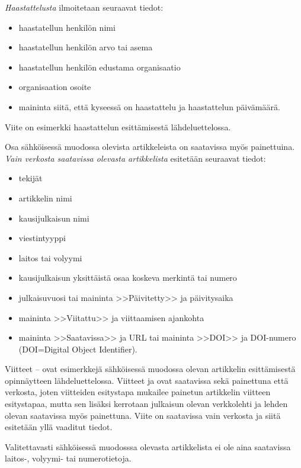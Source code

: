 \documentclass[english,12pt,a4paper,pdftex,sci,utf8]{aaltothesis}
\begin{document}
\textit{Haastattelusta} ilmoitetaan seuraavat tiedot:

\begin{itemize}
\item[--]haastatellun henkil\"on nimi
\item[--]haastatellun henkil\"on arvo tai asema
\item[--]haastatellun henkil\"on edustama organisaatio
\item[--]organisaation osoite
\item[--]maininta siit\"a, ett\"a kyseess\"a on haastattelu ja haastattelun
p\"aiv\"am\"a\"ar\"a. 
\end{itemize}

Viite \cite{haastattelu} on esimerkki 
haastattelun esitt\"amisest\"a l\"ahdeluettelossa.

Osa s\"ahk\"oisess\"a muodossa olevista artikkeleista on saatavissa my\"os
painettuina. \textit{Vain verkosta saatavissa olevasta artikkelista} esitet\"a\"an
seuraavat tiedot:

\begin{itemize}
\item[--]tekij\"at
\item[--]artikkelin nimi
\item[--]kausijulkaisun nimi
\item[--]viestintyyppi
\item[--]laitos tai volyymi
\item[--]kausijulkaisun yksitt\"aist\"a osaa koskeva merkint\"a tai numero
\item[--]julkaisuvuosi tai maininta >>P\"aivitetty>> ja p\"aivitysaika
\item[--]maininta >>Viitattu>> ja viittaamisen ajankohta 
\item[--]maininta >>Saatavissa>> ja URL tai 
        maininta >>DOI>> ja DOI-numero (DOI=Digital Object Identifier).
\end{itemize}

Viitteet \cite{Ribeiro}--\cite{kone} ovat esimerkkej\"a s\"ahk\"oisess\"a
muodossa olevan artikkelin esitt\"amisest\"a opinn\"aytteen
l\"ahdeluettelossa.  Viitteet \cite{Ribeiro} ja \cite{Stieber} ovat
saatavissa sek\"a painettuna ett\"a verkosta, joten viitteiden esitystapa
mukailee painetun artikkelin viitteen esitystapaa, mutta sen lis\"aksi
kerrotaan julkaisun olevan verkkolehti ja lehden olevan saatavissa
my\"os painettuna.  Viite \cite{kone} on saatavissa vain verkosta ja
siit\"a esitet\"a\"an yll\"a vaaditut tiedot.

Valitettavasti s\"ahk\"oisess\"a muodosssa olevasta artikkelista ei ole aina 
saatavissa lai\-tos-, volyymi- tai numerotietoja.
\end{document}
